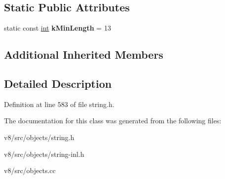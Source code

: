 \subsection*{Static Public Attributes}
\begin{DoxyCompactItemize}
\item 
\mbox{\label{classv8_1_1internal_1_1ConsString_aa2d9a5efa6f974193d3b56fdc2d33044}} 
static const \mbox{\hyperlink{classint}{int}} {\bfseries k\+Min\+Length} = 13
\end{DoxyCompactItemize}
\subsection*{Additional Inherited Members}


\subsection{Detailed Description}


Definition at line 583 of file string.\+h.



The documentation for this class was generated from the following files\+:\begin{DoxyCompactItemize}
\item 
v8/src/objects/string.\+h\item 
v8/src/objects/string-\/inl.\+h\item 
v8/src/objects.\+cc\end{DoxyCompactItemize}

